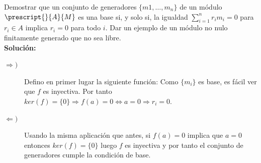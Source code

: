 \begin{ejercicio}
    Demostrar que un conjunto de generadores $\{m1,\ldots,m_n\}$ de un módulo $\prescript{}{A}{M}$ es una base si, y solo si, la igualdad $\sum\limits_{i=1}^n r_im_i = 0$ para $r_i \in A$ implica $r_i = 0$ para todo $i$. Dar un ejemplo de un módulo no nulo finitamente generado que no sea libre. \\
    
    \noindent
    \textbf{Solución:}
    \begin{description}
        \item [$\Longrightarrow)$] 
        Defino en primer lugar la siguiente función:
        Como $\{m_i\}$ es base, es fácil ver que $f$ es inyectiva. Por tanto $ker(f) = \{0\} \Longrightarrow f(a) = 0 \Longleftrightarrow a = 0 \Longrightarrow  r_i = 0$.
        \item [$\Longleftarrow)$]
        Usando la misma aplicación que antes, si $f(a) = 0$ implica que $a = 0$ entonces $ker(f) = \{0\}$ luego $f$ es inyectiva y por tanto el conjunto de generadores cumple la condición de base. 
    \end{description}
\end{ejercicio}

